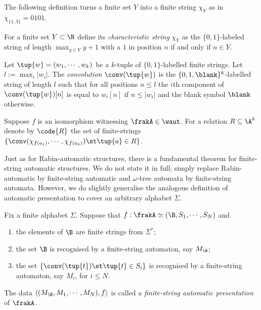 The following definition turns a finite set $Y$ into a finite string $\chi_Y$ as in $\chi_{\{1,3\}} = 0101$.

\begin{definition}
For a finite set $Y \subset \N$ define
its {\em characteristic string} $\chi_Y$ as the $\{0,1\}$-labeled string of length $\max_{y \in Y} y + 1$ with a $1$ in position $n$ if and only if $n \in Y$.
\end{definition}


\begin{definition}
Let $\tup{w} = (w_1,\cdots,w_k)$
be a $k$-tuple of $\{0,1\}$-labelled finite strings. Let $l:= \max_i |w_i|$.
The {\em convolution} $\conv(\tup{w})$ is the $\{0,1,\blank\}^k$-labelled string of length $l$ such that for all positions $n \leq l$
the $i$th component of $\conv(\tup{w})[n]$ is equal to $w_i[n]$ if $n \leq |w_i|$ and the blank symbol $\blank$ otherwise.
\end{definition} %


\begin{definition}
Suppose $f$ is an isomorphism witnessing $\frakA \in \waut$. For a relation $R \subseteq \A^k$ denote by
$\code{R}$ the set of finite-strings  $\{\conv(\chi_{f(a_1)},\cdots,\chi_{f(a_k)}) \st  \tup{a} \in R\}$.  %
\end{definition}

Just as for Rabin-automatic structures, there is a fundamental theorem for finite-string automatic structures. We do not state it in full;
simply replace Rabin-automatic by finite-string automatic and $\omega$-tree automata by finite-string automata.
However, we do slightly generalise the analogous definition of automatic presentation to cover an arbitrary alphabet $\Sigma$.

\begin{definition} \label{AS:dfn:fsap}
Fix a finite alphabet $\Sigma$. Suppose that $f: \frakA \simeq  (\B,S_1,\cdots,S_N)$ and
\begin{enumerate}
\item the elements of $\B$ are finite strings from $\Sigma^\ast$;
\item the set $\B$ is recognised by a finite-string automaton, say $M_\B$; 
\item the set $\{\conv(\tup{t}) \st \tup{t} \in S_i\}$ is recognised by a finite-string automaton, say $M_i$, for $i \leq N$.
\end{enumerate}
The data $\left<(M_\B,M_1,\cdots,M_N), f \right>$ is called a {\em finite-string automatic presentation} of $\frakA$.
\end{definition}

